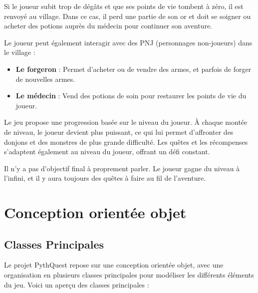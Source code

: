 \documentclass{article}
\begin{document}
Si le joueur subit trop de dégâts et que ses points de vie tombent à zéro, il est renvoyé au village. Dans ce cas, il perd une partie de son or et doit se soigner ou acheter des potions auprès du médecin pour continuer son aventure.

Le joueur peut également interagir avec des PNJ (personnages non-joueurs) dans le village :
\begin{itemize}
    \item \textbf{Le forgeron} : Permet d'acheter ou de vendre des armes, et parfois de forger de nouvelles armes.
    \item \textbf{Le médecin} : Vend des potions de soin pour restaurer les points de vie du joueur.
\end{itemize}

Le jeu propose une progression basée sur le niveau du joueur. À chaque montée de niveau, le joueur devient plus puissant, ce qui lui permet d'affronter des donjons et des monstres de plus grande difficulté. Les quêtes et les récompenses s'adaptent également au niveau du joueur, offrant un défi constant.

Il n'y a pas d'objectif final à proprement parler. Le joueur gagne du niveau à l'infini, et il y aura toujours des quêtes à faire au fil de l'aventure.

\section{Conception orientée objet}

\subsection{Classes Principales}

Le projet PythQuest repose sur une conception orientée objet, avec une organisation en plusieurs classes principales pour modéliser les différents éléments du jeu. Voici un aperçu des classes principales :
\end{document}
